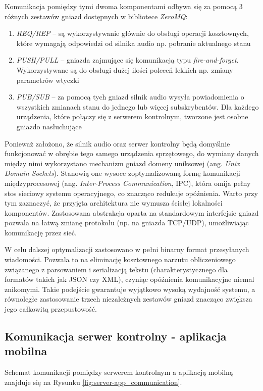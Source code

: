 \documentclass[12pt,a4paper]{report}
\begin{document}
Komunikacja pomiędzy tymi dwoma komponentami odbywa się za pomocą 3
różnych zestawów gniazd dostępnych w bibliotece \textit{ZeroMQ}:
\begin{enumerate}
  \item \textit{REQ/REP} -- są wykorzystywanie głównie do obsługi
    operacji kosztownych, które wymagają odpowiedzi od silnika audio
    np. pobranie aktualnego stanu
  \item \textit{PUSH/PULL} -- gniazda zajmujące się komunikacją typu
    \textit{fire-and-forget}. Wykorzystywane są do obsługi dużej
    ilości poleceń lekkich np. zmiany parametrów wtyczki
  \item \textit{PUB/SUB} -- za pomocą tych gniazd silnik audio wysyła
    powiadomienia o wszystkich zmianach stanu do jednego lub więcej
    subskrybentów. Dla każdego urządzenia, które połączy się z
    serwerem kontrolnym, tworzone jest osobne gniazdo nasłuchujące
\end{enumerate}

Ponieważ założono, że silnik audio oraz serwer kontrolny będą
domyślnie funkcjonować w obrębie tego samego urządzenia sprzętowego,
do wymiany danych między nimi wykorzystano mechanizm gniazd domeny
uniksowej (ang. \textit{Unix Domain Sockets}). Stanowią one wysoce
zoptymalizowaną formę komunikacji międzyprocesowej (ang.
\textit{Inter-Process Communication}, IPC), która omija pełny stos
sieciowy systemu operacyjnego, co znacząco redukuje opóźnienia. Warto
przy tym zaznaczyć, że przyjęta architektura nie wymusza ścisłej
lokalności komponentów. Zastosowana abstrakcja oparta na standardowym
interfejsie gniazd pozwala na łatwą zmianę protokołu (np. na gniazda
TCP/UDP), umożliwiając komunikację przez sieć.

W celu dalszej optymalizacji zastosowano w pełni binarny format
przesyłanych wiadomości. Pozwala to na eliminację kosztownego narzutu
obliczeniowego związanego z parsowaniem i serializacją tekstu
(charakterystycznego dla formatów takich jak JSON czy XML), czyniąc
opóźnienia komunikacyjne niemal znikomymi. Takie podejście gwarantuje
wyjątkowo wysoką wydajność systemu, a równoległe zastosowanie trzech
niezależnych zestawów gniazd znacząco zwiększa jego całkowitą przepustowość.

\subsection{Komunikacja serwer kontrolny - aplikacja mobilna}
Schemat komunikacji pomiędzy serwerem kontrolnym a aplikacją mobilną
znajduje się na Rysunku \ref{fig:server-app_communication}.
\end{document}
